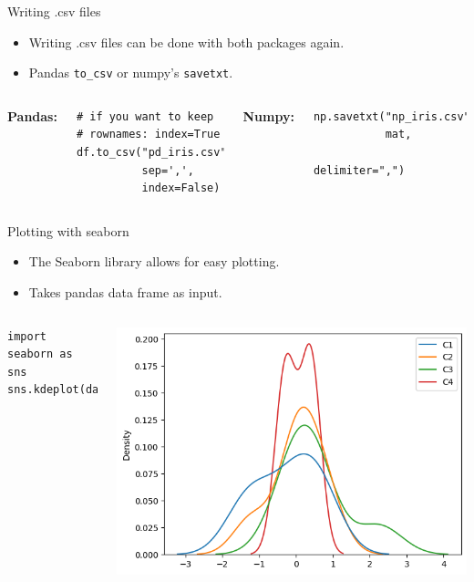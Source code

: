 \documentclass[compress%
,aspectratio=169%
]{beamer}
\newcommand{\code}{\lstinline}
\begin{document}
\begin{frame}[fragile]{Writing .csv files}
\begin{itemize}
    \item Writing .csv files can be done with both packages again.
    \item Pandas \code{to_csv} or numpy's \code{savetxt}.
\end{itemize}
\vspace{0.5cm}
\begin{columns}

\textbf{Pandas:}
\begin{lstlisting}
# if you want to keep 
# rownames: index=True
df.to_csv("pd_iris.csv", 
          sep=',',
          index=False)
\end{lstlisting}

\textbf{Numpy:}
\begin{lstlisting}
np.savetxt("np_iris.csv", 
           mat, 
           delimiter=",")
\end{lstlisting}
\end{columns}

\end{frame}

\begin{frame}[fragile]{Plotting with seaborn}
\begin{itemize}
    \item The Seaborn library allows for easy plotting.
    \item Takes pandas data frame as input.
\end{itemize}

\begin{columns}
    
\begin{lstlisting}
import seaborn as sns
sns.kdeplot(data=df)
\end{lstlisting}

\includegraphics[width = \linewidth]{img/kdeplot.png}

\end{columns}

\end{frame}
\end{document}
